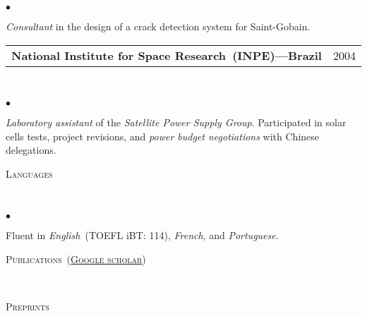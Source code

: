 \documentclass[a4paper,11pt]{article}
\makeatletter
\newcommand{\CVheading}[1]{
	\vspace{10pt}
	{ \large
	\begin{minipage}{\textwidth}
		\textsc{#1 \vphantom{p\^{E}}}
	\end{minipage} } \\
	\vspace{5pt}
}
\newcommand{\CVsubheading}[2]{
	\begin{tabular*}{\textwidth}{l@{\extracolsep{\fill}}r}
		\textbf{#1} & #2 \\
	\end{tabular*} \\
}
\newcommand{\CVlist}{
	\begin{list}{$\bullet$}{
	\setlength{\itemsep}{0pt}
	\setlength{\parsep}{1pt}
	\setlength{\topsep}{1pt}
	\setlength{\partopsep}{0pt}
	\setlength{\leftmargin}{24pt}
	\setlength{\labelwidth}{1em} }
}
\newcommand{\CVlistend}{
	\end{list}
	\vspace{3pt}
}
\makeatother
\begin{document}
	\CVlist

	\item
	\textit{Consultant} in the design of a crack detection system for Saint-Gobain.

	\CVlistend


\CVsubheading{National Institute for Space Research~(INPE)---Brazil}{2004}

	\CVlist

	\item
	\textit{Laboratory assistant} of the \textit{Satellite Power Supply Group}. Participated in solar cells tests, project revisions, and \emph{power budget negotiations} with Chinese delegations.

	\CVlistend


\CVheading{Languages}
	\vspace{-2pt}
	\CVlist

	\item
	Fluent in \textit{English}~(TOEFL iBT: 114), \textit{French}, and \textit{Portuguese}.

	\CVlistend




%
%
%
%
%
%
%
%
%



\nocite{*}
\setlength\bibitemsep{3pt}


\CVheading{Publications~(\href{http://scholar.google.ca/citations?user=FIm-l-sAAAAJ}{Google scholar})}

\vspace*{-6pt}
\CVheading{Preprints}
\vspace*{-8pt}
\printbibliography[heading=none, resetnumbers=true, keyword=preprint]
\end{document}
